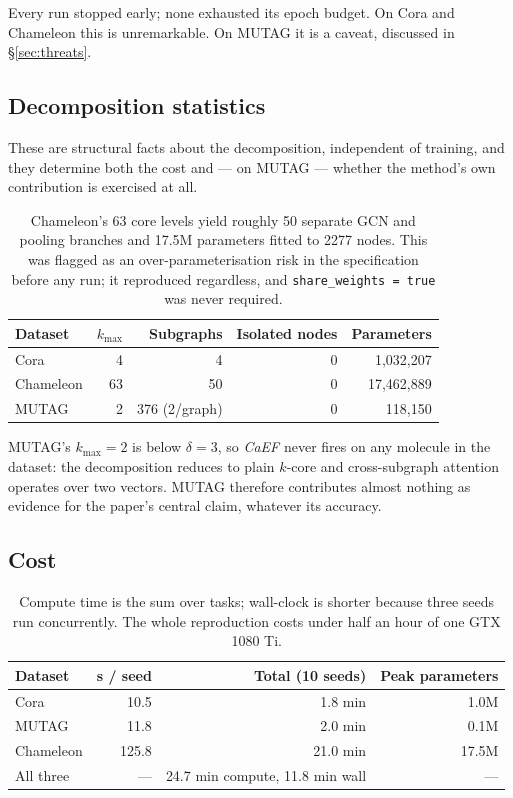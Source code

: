 \documentclass[11pt,a4paper]{article}
\newcommand{\caef}{\textit{CaEF}}
\begin{document}
Every run stopped early; none exhausted its epoch budget. On Cora and Chameleon this is
unremarkable. On MUTAG it is a caveat, discussed in \S\ref{sec:threats}.

\subsection{Decomposition statistics}

These are structural facts about the decomposition, independent of training, and they determine
both the cost and --- on MUTAG --- whether the method's own contribution is exercised at all.

\begin{table}[!htbp]
\centering
\begin{tabular}{lrrrr}
\toprule
Dataset & $k_{\max}$ & Subgraphs & Isolated nodes & Parameters \\
\midrule
Cora      & 4  & 4              & 0 & 1{,}032{,}207 \\
Chameleon & 63 & 50             & 0 & 17{,}462{,}889 \\
MUTAG     & 2  & 376 (2/graph)  & 0 & 118{,}150 \\
\bottomrule
\end{tabular}
\caption{Chameleon's 63 core levels yield roughly 50 separate GCN and pooling branches and 17.5M
parameters fitted to 2277 nodes. This was flagged as an over-parameterisation risk in the
specification before any run; it reproduced regardless, and \texttt{share\_weights = true} was
never required.}
\end{table}

MUTAG's $k_{\max} = 2$ is below $\delta = 3$, so \caef{} never fires on any molecule in the
dataset: the decomposition reduces to plain $k$-core and cross-subgraph attention operates over two
vectors. MUTAG therefore contributes almost nothing as evidence for the paper's central claim,
whatever its accuracy.

\subsection{Cost}

\begin{table}[!htbp]
\centering
\begin{tabular}{lrrr}
\toprule
Dataset & s / seed & Total (10 seeds) & Peak parameters \\
\midrule
Cora      & 10.5  & 1.8 min  & 1.0M \\
MUTAG     & 11.8  & 2.0 min  & 0.1M \\
Chameleon & 125.8 & 21.0 min & 17.5M \\
\midrule
All three & --- & 24.7 min compute, 11.8 min wall & --- \\
\bottomrule
\end{tabular}
\caption{Compute time is the sum over tasks; wall-clock is shorter because three seeds run
concurrently. The whole reproduction costs under half an hour of one GTX 1080 Ti.}
\end{table}
\end{document}
